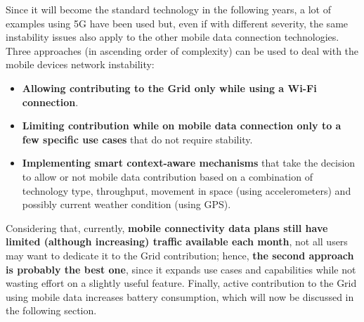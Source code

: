 Since it will become the standard technology in the following years, a lot of examples using 5G have been used  but, even if with different severity, the same instability issues also apply to the other mobile data connection technologies. Three approaches (in ascending order of complexity) can be used to deal with the mobile devices network instability:
\begin{itemize}
    \item \textbf{Allowing contributing to the Grid only while using a Wi-Fi connection}.
    \item \textbf{Limiting contribution while on mobile data connection only to a few specific use cases} that do not require stability.
    \item \textbf{Implementing smart context-aware mechanisms} that take the decision to allow or not mobile data contribution based on a combination of technology type, throughput, movement in space (using accelerometers) and possibly current weather condition (using GPS).
\end{itemize}

Considering that, currently, \textbf{mobile connectivity data plans still have limited (although increasing) traffic available each month}, not all users may want to dedicate it to the Grid contribution; hence, \textbf{the second approach is probably the best one}, since it expands use cases and capabilities while not wasting effort on a slightly useful feature. Finally, active contribution to the Grid using mobile data increases battery consumption, which will now be discussed in the following section.

